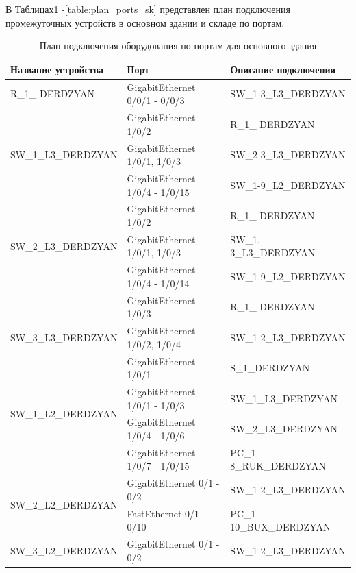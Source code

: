 В Таблицах\;\ref{table:plan_ports_oz} -\;\ref{table:plan_ports_sk} представлен план подключения промежуточных устройств в основном здании и складе по портам.

\begin{table}[H]
    \centering
	\caption{План подключения оборудования по портам для основного здания\label{table:plan_ports_oz}}
    \small
	\begin{tabularx}{\textwidth}{|X|X|X|}
        \hline
		Название устройства& Порт&Описание подключения \\
        \hline
		\multirow{1}{*}{R\_1\_ DERDZYAN} & GigabitEthernet 0/0/1 - 0/0/3 & SW\_1-3\_L3\_DERDZYAN \\
		\hline
		\multirow{3}{*}{SW\_1\_L3\_DERDZYAN} & GigabitEthernet 1/0/2 &  R\_1\_ DERDZYAN \\
		\cline{2-3}
			& GigabitEthernet 1/0/1, 1/0/3 & SW\_2-3\_L3\_DERDZYAN \\
		\cline{2-3}
			& GigabitEthernet 1/0/4 - 1/0/15 & SW\_1-9\_L2\_DERDZYAN \\
		\hline
		\multirow{3}{*}{SW\_2\_L3\_DERDZYAN} & GigabitEthernet 1/0/2 &  R\_1\_ DERDZYAN \\
		\cline{2-3}
			& GigabitEthernet 1/0/1, 1/0/3 & SW\_1, 3\_L3\_DERDZYAN \\
		\cline{2-3}
			& GigabitEthernet 1/0/4 - 1/0/14 & SW\_1-9\_L2\_DERDZYAN \\
		\hline
		\multirow{3}{*}{SW\_3\_L3\_DERDZYAN} & GigabitEthernet 1/0/3 &  R\_1\_ DERDZYAN \\
		\cline{2-3}
			& GigabitEthernet 1/0/2, 1/0/4 & SW\_1-2\_L3\_DERDZYAN \\
		\cline{2-3}
			& GigabitEthernet 1/0/1 & S\_1\_DERDZYAN \\
		\hline
		\multirow{2}{*}{SW\_1\_L2\_DERDZYAN} & GigabitEthernet 1/0/1 - 1/0/3 & SW\_1\_L3\_DERDZYAN  \\
		\cline{2-3}
			& GigabitEthernet 1/0/4 - 1/0/6 & SW\_2\_L3\_DERDZYAN  \\
		\cline{2-3}
			& GigabitEthernet 1/0/7 - 1/0/15 & PC\_1-8\_RUK\_DERDZYAN \\
		\hline
		\multirow{2}{*}{SW\_2\_L2\_DERDZYAN} & GigabitEthernet 0/1 - 0/2 & SW\_1-2\_L3\_DERDZYAN  \\
		\cline{2-3}
			& FastEthernet 0/1 - 0/10 & PC\_1-10\_BUX\_DERDZYAN \\
		\hline
		\multirow{2}{*}{SW\_3\_L2\_DERDZYAN} & GigabitEthernet 0/1 - 0/2 & SW\_1-2\_L3\_DERDZYAN  \\

\end{tabularx}
\end{table}
